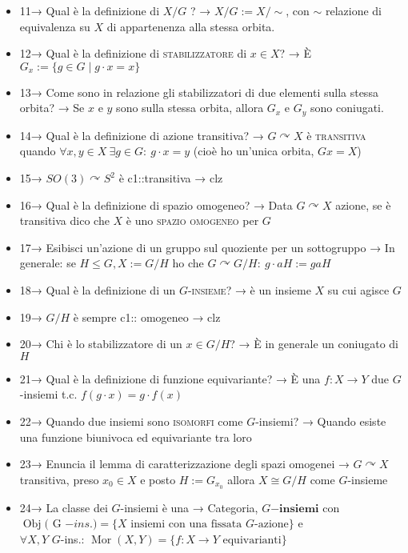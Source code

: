 \documentclass[A4,12pt]{article}
\newcommand{\acts}{\curvearrowright}
\newcommand{\Ginsmth}{  G\!\mathbf{-insiemi}}
\newcommand{\Gins}{$ G $-ins.}
\begin{document}
\begin{itemize}[noitemsep]
		\item 11→ Qual è la definizione di $ X/G $ ? → $ X/G:= X/\sim $, con $ \sim $ relazione di equivalenza su $ X $ di appartenenza alla stessa orbita.
		\item 12→ Qual è la definizione di \textsc{stabilizzatore} di $ x\in X $? → È $ G_x :=\{g\in G\mid g\cdot x = x\}$ 
		\item 13→ Come sono in relazione gli stabilizzatori di due elementi sulla stessa orbita? → Se $ x$ e $ y $ sono sulla stessa orbita, allora $ G_x $ e $ G_y $ sono coniugati.
		\item 14→ Qual è la definizione di azione transitiva? → $ G\acts X $ è \textsc{transitiva} quando $ \forall x,y\in X\ \exists g\in G:\ g\cdot x = y$ (cioè ho un'unica orbita, $ Gx = X $)
		\item 15→ $ SO(3)\acts S^2 $ è {{c1::transitiva }} → clz
		\item 16→ Qual è la definizione di spazio omogeneo? → Data $ G\acts X $ azione, se è transitiva dico che $ X $ è uno \textsc{spazio omogeneo} per $ G $ 
		\item 17→ Esibisci un'azione di un gruppo sul quoziente per un sottogruppo → In generale: se $ H\leq G, X:= G/H $ ho che $ G\acts G/H:\ g\cdot aH:= gaH $
		\item 18→ Qual è la definizione di un $ G $-\textsc{insieme}? → è un insieme $ X $ su cui agisce $ G $
		\item 19→ $ G/H $ è sempre {{c1:: omogeneo }} → clz
		\item 20→ Chi è lo stabilizzatore di un $ x\in G/H $? → È in generale un coniugato di $ H $
		\item 21→ Qual è la definizione di funzione equivariante? → È una $ f:X\to Y  $ due $ G $-insiemi t.c. $ f(g\cdot x) =g \cdot f(x) $
		\item 22→ Quando due insiemi sono \textsc{isomorfi} come $ G $-insiemi? → Quando esiste una funzione biunivoca ed equivariante tra loro
		\item 23→ Enuncia il lemma di caratterizzazione degli spazi omogenei → $ G\acts X $ transitiva, preso $ x_0\in X $ e posto $ H :=G_{x_0} $ allora $ X\cong G/H $ come $ G $-insieme 
		\item 24→ La classe dei $ G $-insiemi è una → Categoria, $\Ginsmth$ con\\ $\operatorname{Obj}(\Gins)=\{X\text{ insiemi con una fissata } G \text{-azione}\}$ e \\$ \forall  X,Y $ \Gins :  $ \operatorname{Mor}(X,Y) = \{f:X\to Y \text{ equivarianti}\} $

\end{itemize}
\end{document}
